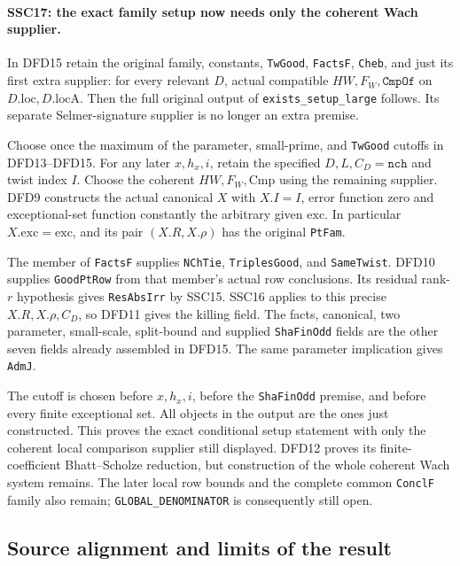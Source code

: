 \paragraph{SSC17: the exact family setup now needs only the coherent Wach supplier.}
\label{claim:SSC17}
In DFD15 retain the original family, constants, \texttt{TwGood},
\texttt{FactsF}, \texttt{Cheb}, and just its first extra supplier:
for every relevant $D$, actual compatible
$HW,F_W,\texttt{CmpOf}$ on $D.\mathrm{loc},D.\mathrm{locA}$.
Then the full original output of \texttt{exists\_setup\_large}
follows. Its separate Selmer-signature supplier is no longer an
extra premise.

Choose once the maximum of the parameter, small-prime, and
\texttt{TwGood} cutoffs in DFD13--DFD15. For any later
$x,h_x,i$, retain the specified $D,L,C_D=\texttt{nch}$ and twist
index $I$. Choose the coherent $HW,F_W,\mathrm{Cmp}$ using the
remaining supplier. DFD9 constructs the actual canonical
$X$ with $X.I=I$, error function zero and exceptional-set function
constantly the arbitrary given $\mathrm{exc}$. In particular
$X.\mathrm{exc}=\mathrm{exc}$, and its pair $(X.R,X.\rho)$ has
the original \texttt{PtFam}.

The member of \texttt{FactsF} supplies \texttt{NChTie},
\texttt{TriplesGood}, and \texttt{SameTwist}. DFD10 supplies
\texttt{GoodPtRow} from that member's actual row conclusions.
Its residual rank-$r$ hypothesis gives \texttt{ResAbsIrr} by
SSC15. SSC16 applies to this precise $X.R,X.\rho,C_D$, so DFD11
gives the killing field. The facts, canonical, two parameter,
small-scale, split-bound and supplied \texttt{ShaFinOdd} fields
are the other seven fields already assembled in DFD15.
The same parameter implication gives \texttt{AdmJ}.

The cutoff is chosen before $x,h_x,i$, before the
\texttt{ShaFinOdd} premise, and before every finite exceptional
set. All objects in the output are the ones just constructed.
This proves the exact conditional setup statement with only the
coherent local comparison supplier still displayed. DFD12 proves
its finite-coefficient Bhatt--Scholze reduction, but construction
of the whole coherent Wach system remains. The later local row
bounds and the complete common \texttt{ConclF} family also remain;
\texttt{GLOBAL\_DENOMINATOR} is consequently still open.

\subsection{Source alignment and limits of the result}

